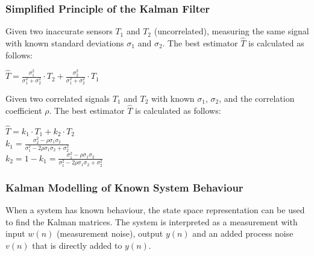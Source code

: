 \subsubsection{Simplified Principle of the Kalman Filter}
\begin{minipage}{14.5cm}
Given two inaccurate sensors $T_1$ and $T_2$ (uncorrelated), measuring the same signal with known standard deviations $\sigma_1$ and $\sigma_2$. The best
estimator $\hat{T}$ is calculated as follows:\\
\end{minipage}
\hspace{0.25cm}
\begin{minipage}{5cm}
$\hat{T}=\frac{\sigma_1^2}{\sigma_1^2+\sigma_2^2}\cdot T_2+\frac{\sigma_2^2}{\sigma_1^2+\sigma_2^2}\cdot T_1$
\end{minipage}
\begin{minipage}{14.5cm}
Given two correlated signals $T_1$ and $T_2$ with known $\sigma_1$, $\sigma_2$, and the correlation coefficient $\rho$. The best
estimator $\hat{T}$ is calculated as follows:\\
\end{minipage}
\hspace{0.25cm}
\begin{minipage}{5cm}
$\hat{T}=k_1\cdot T_1 + k_2\cdot T_2$\\
$k_1=\frac{\sigma_2^2-\rho \sigma_1 \sigma_2}{\sigma_1^2 - 2 \rho \sigma_1 \sigma_2 + \sigma_2^2}$\\
$k_2=1-k_1=\frac{\sigma_1^2-\rho \sigma_1 \sigma_2}{\sigma_1^2 - 2 \rho \sigma_1 \sigma_2 + \sigma_2^2}$\\
\end{minipage}


\subsubsection{Kalman Modelling of Known System Behaviour}
When a system has known behaviour, the state space representation can be used to find the Kalman matrices. The system is interpreted as a measurement with input $w(n)$ (measurement noise), output $y(n)$ and an added process noise $v(n)$ that is directly added to $y(n)$.


